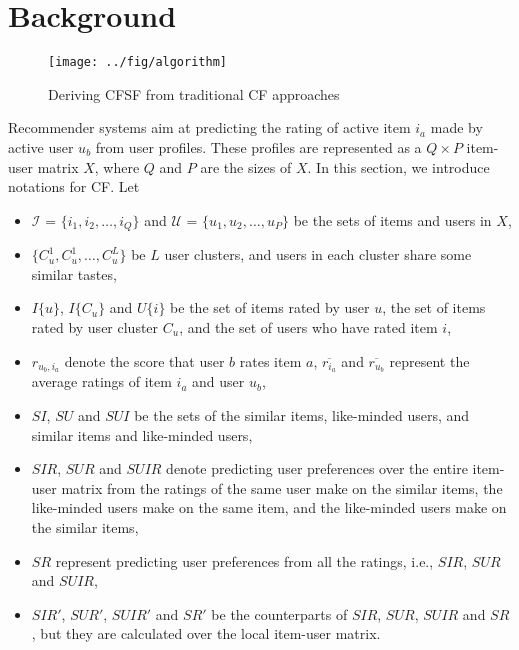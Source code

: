 \section{Background}\label{sec:background}
\begin{figure*}
  \centering
  \texttt{[image: ../fig/algorithm]}
  \vspace{-2ex}\caption{Deriving CFSF from traditional CF approaches}\label{fig:cfsf}
  \label{fig:algorithm}
  \vspace{-2ex}
\end{figure*}

Recommender systems aim at predicting the rating of active item $i_a$
made by active user $u_b$ from user profiles. These profiles are
represented as a $Q \times P$ item-user matrix $X$, where $Q$ and $P$
are the sizes of $X$. In this section, we introduce notations for CF.
Let
\begin{itemize}
  \item $\mathcal{I}$ = $\{i_1, i_2, \ldots, i_Q\}$ and
      $\mathcal{U}$ = $\{u_1, u_2, \ldots, u_P\}$ be the sets of
      items and users in $X$,
  \item $\{C_u^{1}, C_u^{1}, \ldots, C_u^{L}\}$ be $L$ user
      clusters, and users in each cluster share some similar
      tastes,
  \item $I\{u\}$, $I\{C_u\}$ and $U\{i\}$ be the set of items rated
      by user $u$, the set of items rated by user cluster $C_u$,
      and the set of users who have rated item $i$,
  \item $r_{u_b, i_a}$ denote the score that user $b$ rates item
      $a$, $\overline{r_{i_a}}$ and $\overline{r_{u_b}}$ represent
      the average ratings of item $i_a$ and user $u_b$,
  \item $SI$, $SU$ and $SUI$ be the sets of the similar items,
      like-minded users, and similar items and like-minded users,
  \item $SIR$, $SUR$ and $SUIR$ denote predicting user preferences
      over the entire item-user matrix from the ratings of the same
      user make on the similar items, the like-minded users make on
      the same item, and the like-minded users make on the similar
      items,
  \item $SR$ represent predicting user preferences from all the
      ratings, i.e., $SIR$, $SUR$ and $SUIR$,
  \item $SIR'$, $SUR'$, $SUIR'$ and $SR'$ be the counterparts of
      $SIR$, $SUR$, $SUIR$ and $SR$, but they are calculated over
      the local item-user matrix.
  \end{itemize}
